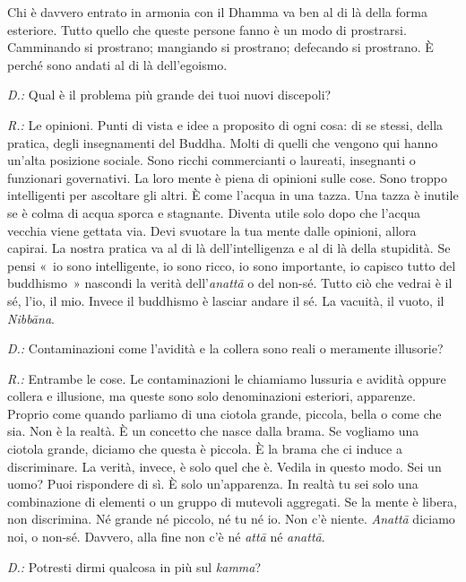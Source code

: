 Chi è davvero entrato in armonia con il Dhamma va ben al di là della
forma esteriore. Tutto quello che queste persone fanno è un modo di
prostrarsi. Camminando si prostrano; mangiando si prostrano; defecando
si prostrano. È perché sono andati al di là dell'egoismo.

\emph{D.:} Qual è il problema più grande dei tuoi nuovi discepoli?

\emph{R.:} Le opinioni. Punti di vista e idee a proposito di ogni cosa: di se
stessi, della pratica, degli insegnamenti del Buddha. Molti di quelli
che vengono qui hanno un'alta posizione sociale. Sono ricchi
commercianti o laureati, insegnanti o funzionari governativi. La loro
mente è piena di opinioni sulle cose. Sono troppo intelligenti per
ascoltare gli altri. È come l'acqua in una tazza. Una tazza è inutile se
è colma di acqua sporca e stagnante. Diventa utile solo dopo che l'acqua
vecchia viene gettata via. Devi svuotare la tua mente dalle opinioni,
allora capirai. La nostra pratica va al di là dell'intelligenza e al di
là della stupidità. Se pensi «~io sono intelligente, io sono ricco, io
sono importante, io capisco tutto del buddhismo~» nascondi la verità
dell'\emph{anattā} o del non-sé. Tutto ciò che vedrai è il sé, l'io, il
mio. Invece il buddhismo è lasciar andare il sé. La vacuità, il vuoto,
il \emph{Nibbāna}.

\emph{D.:} Contaminazioni come l'avidità e la collera sono reali o meramente
illusorie?

\emph{R.:} Entrambe le cose. Le contaminazioni le chiamiamo lussuria e avidità
oppure collera e illusione, ma queste sono solo denominazioni esteriori,
apparenze. Proprio come quando parliamo di una ciotola grande, piccola,
bella o come che sia. Non è la realtà. È un concetto che nasce dalla
brama. Se vogliamo una ciotola grande, diciamo che questa è piccola. È
la brama che ci induce a discriminare. La verità, invece, è solo quel
che è. Vedila in questo modo. Sei un uomo? Puoi rispondere di sì. È solo
un'apparenza. In realtà tu sei solo una combinazione di elementi o un
gruppo di mutevoli aggregati. Se la mente è libera, non discrimina. Né
grande né piccolo, né tu né io. Non c'è niente. \emph{Anattā} diciamo
noi, o non-sé. Davvero, alla fine non c'è né \emph{attā} né
\emph{anattā}.

\emph{D.:} Potresti dirmi qualcosa in più sul \emph{kamma}?

